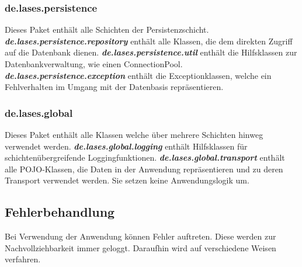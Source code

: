 \subsubsection{de.lases.persistence}\label{arch:persistence}
Dieses Paket enthält alle Schichten der Persistenzschicht.
\newline\newline
\textbf{\emph{de.lases.persistence.repository}}\label{arch:repository}
enthält alle Klassen, die dem direkten Zugriff auf die Datenbank dienen.
\newline\newline
\textbf{\emph{de.lases.persistence.util}}
enthält die Hilfsklassen zur Datenbankverwaltung, wie einen
Connection\-Pool.
\newline\newline
\textbf{\emph{de.lases.persistence.exception}}
enthält die Exceptionklassen, welche ein Fehlverhalten im Umgang mit der
Datenbasis repräsentieren.

\subsubsection{de.lases.global}
Dieses Paket enthält alle Klassen welche über mehrere Schichten hinweg
verwendet werden.
\newline\newline
\textbf{\emph{de.lases.global.logging}}
enthält Hilfsklassen für schichtenübergreifende Loggingfunktionen.
\newline\newline
\textbf{\emph{de.lases.global.transport}}\label{arch:transport}
enthält alle POJO-Klassen, die Daten in der Anwendung repräsentieren und zu deren
Transport verwendet werden. Sie setzen keine Anwendungslogik um.


\subsection{Fehlerbehandlung}
Bei Verwendung der Anwendung können Fehler auftreten. Diese werden zur Nachvollziehbarkeit
immer geloggt. Daraufhin wird auf verschiedene Weisen verfahren.


